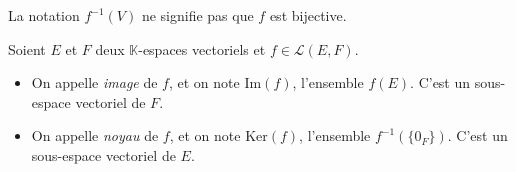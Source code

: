 \documentclass[french,11pt,twoside]{VcCours}
\begin{document}
\begin{Demonstration}{}
%
%
%
%
%

\vspace{12cm}

 \end{Demonstration}
 
 \begin{Remarque}{}
	\warning{}  La notation $f^{-1}(V)$ ne signifie pas que $f$ est bijective.
 \end{Remarque}
 
 \begin{TheoremeDefinition}{} Soient $E$ et $F$ deux $\mathbb{K}$-espaces vectoriels et $f \in \mathcal{L}(E,F)$.
\begin{itemize}
 \item On appelle \emph{image} de $f$, et on note $\textrm{Im}(f)$, l'ensemble $f(E)$. C'est un sous-espace vectoriel de $F$.
 \item On appelle \emph{noyau} de $f$, et on note $\textrm{Ker}(f)$, l'ensemble $f^{-1}(\lbrace 0_F \rbrace)$. C'est un sous-espace vectoriel de $E$.
 \end{itemize}
 \end{TheoremeDefinition}
 
\end{document}
